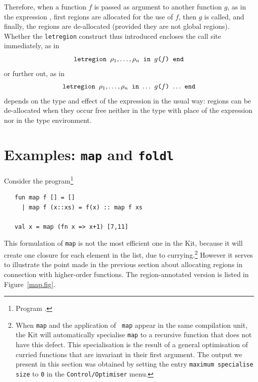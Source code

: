 \documentclass[12pt]{book}
\begin{document}
Therefore, when a function $f$ is passed as argument to another
function $g$, as in the expression , first regions are
allocated for the use of $f$, then $g$ is called, and finally, the
regions are de-allocated (provided they are not global regions).
Whether the {\tt letregion} construct thus introduced encloses the
call site immediately, as in
$$\hbox{\tt letregion $\rho_1,\ldots,\rho_n$ in $g$($f$) end}$$
or further out, as in
$$\hbox{\tt letregion $\rho_1,\ldots,\rho_n$ in $\ldots$ $g$($f$)
  $\ldots$ end}$$
depends on the type and effect of the expression
 in the usual way: regions can be de-allocated when
they occur free neither in the type with place of the expression
nor in the type environment.

\section{Examples: {\tt map} and {\tt foldl}}
Consider the program\footnote{Program .}
\begin{verbatim}
   fun map f [] = []
     | map f (x::xs) = f(x) :: map f xs
   
   val x = map (fn x => x+1) [7,11]
\end{verbatim}
This formulation of {\tt map} is not the most efficient one in the
Kit, because it will create one closure for each element in the list,
due to currying.\footnote{When {\tt map} and the application of {\tt
    map} appear in the same compilation unit, the Kit will
  automatically specialise {\tt map} to a recursive function that does
  not have this defect. This specialisation is the result of a general
  optimisation of curried functions that are invariant in their first
  argument. The output we present in this section was obtained by
  setting the entry {\tt maximum specialise size} to {\tt 0} in the
  {\tt Control/Optimiser} menu.} However it serves to illustrate the
point made in the previous section about allocating regions in
connection with higher-order functions. The region-annotated version
is listed in Figure~\ref{map.fig}.
\end{document}
